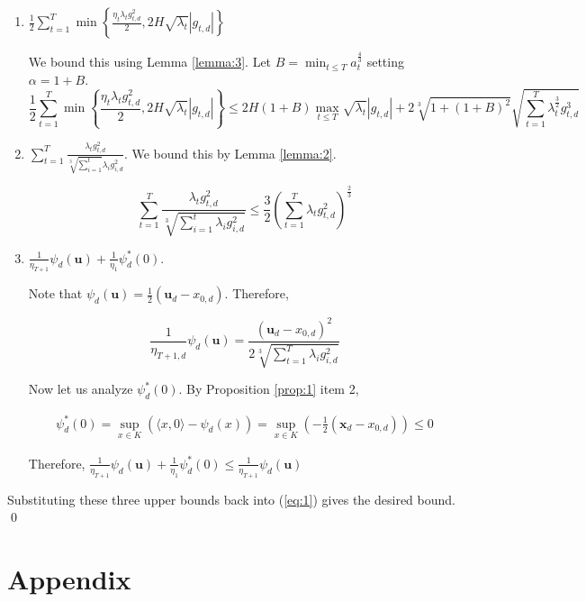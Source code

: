 \documentclass{article}
\newcommand{\bx}{\mathbf{x}}
\newcommand{\bu}{\mathbf{u}}
\begin{document}
\begin{enumerate}
\item $\frac{1}{2}\sum\limits_{t=1}^T \min \left\{\frac{\eta_t \lambda_t g_{t,d}^2}{2}, 2H\sqrt{\lambda_t}|g_{t,d}|\right\}$

  We bound this using Lemma \ref{lemma:3}. Let $B = \min_{t\leq T}a_{t}^\frac{4}{3}$ setting $\alpha = 1+B$.
  \[
    \frac{1}{2}\sum\limits_{t=1}^T \min \left\{\frac{\eta_t \lambda_t g_{t,d}^2}{2}, 2H\sqrt{\lambda_t}|g_{t,d}|\right\}
    \leq 2H(1+B)\max_{t\leq T}\sqrt{\lambda_t}|g_{t,d}| +
    2\sqrt[3]{1 + (1+B)^2}\sqrt{\sum\limits_{t=1}^T \lambda_{t}^\frac{3}{2} g_{t,d}^3}
  \]
\item $\sum\limits_{t=1}^T \frac{\lambda_t g_{t,d}^2}{\sqrt[3]{\sum\limits_{i=1}^t}\lambda_i g_{i,d}^2}$. We bound this
  by Lemma \ref{lemma:2}.

  \[
    \sum\limits_{t=1}^T \frac{\lambda_t g_{t,d}^2}{\sqrt[3]{\sum\limits_{i=1}^t\lambda_i g_{i,d}^2}} \leq \frac{3}{2}
    \left(\sum\limits_{t=1}^T \lambda_t g_{t,d}^2\right)^\frac{2}{3}
  \]
\item $\frac{1}{\eta_{T+1}}\psi_{d}(\bu) + \frac{1}{\eta_1}\psi_{d}^*(0)$.

  Note that $\psi_d(\bu) = \frac{1}{2}(\bu_d - x_{0,d})$. Therefore,

  \[
    \frac{1}{\eta_{T+1,d}}\psi_d(\bu) = \frac{(\bu_d - x_{0,d})^2}{2 \sqrt[3]{\sum\limits_{t=1}^T \lambda_i g_{i,d}^2}}
  \]

  Now let us analyze $\psi_d^*(0)$. By Proposition \ref{prop:1} item 2,

  \begin{align*}
    \psi_d^*(0) = \sup\limits_{x \in K}(\langle x , 0 \rangle - \psi_d(x)) = \sup_{x \in K}(-\frac{1}{2}(\bx_d -
    x_{0,d})) \leq 0
  \end{align*}

  Therefore, $\frac{1}{\eta_{T+1}}\psi_{d}(\bu) + \frac{1}{\eta_1}\psi_{d}^*(0) \leq \frac{1}{\eta_{T+1}}\psi_{d}(\bu)$
\end{enumerate}

Substituting these three upper bounds back into (\ref{eq:1}) gives the desired bound. \\
\qed

\newpage




\newpage

\appendix
\section{Appendix}
\end{document}
